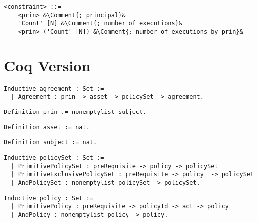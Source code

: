 \lstset{mathescape, language=AST, escapechar=\&}  
\begin{lstlisting}[frame=single, caption={constraint},label={lst:constraintast}]
<constraint> ::=  
	<prin> &\Comment{; principal}&
	'Count' [N] &\Comment{; number of executions}&
	<prin> ('Count' [N]) &\Comment{; number of executions by prin}&
\end{lstlisting}

\section{Coq Version}

\lstset{language=Coq}
\begin{lstlisting}[frame=single, caption={Coq version of agreement},label={lst:agreementcoq}]
Inductive agreement : Set :=
  | Agreement : prin -> asset -> policySet -> agreement.
\end{lstlisting}

\lstset{language=Coq}
\begin{lstlisting}[frame=single, caption={prin},label={lst:princoq}]
Definition prin := nonemptylist subject.
\end{lstlisting}

\lstset{language=Coq}
\begin{lstlisting}[frame=single, caption={asset},label={lst:assetcoq}]
Definition asset := nat.
\end{lstlisting}



\lstset{language=Coq}
\begin{lstlisting}[frame=single, caption={subject},label={lst:subjectcoq}]
Definition subject := nat.
\end{lstlisting}


\lstset{language=Coq}
\begin{lstlisting}[frame=single, caption={policySet},label={lst:policySetcoq}]
Inductive policySet : Set :=
  | PrimitivePolicySet : preRequisite -> policy -> policySet 
  | PrimitiveExclusivePolicySet : preRequisite -> policy  -> policySet 
  | AndPolicySet : nonemptylist policySet -> policySet.
\end{lstlisting}

\lstset{language=Coq}
\begin{lstlisting}[frame=single, caption={policy},label={lst:policycoq}]
Inductive policy : Set :=
  | PrimitivePolicy : preRequisite -> policyId -> act -> policy 
  | AndPolicy : nonemptylist policy -> policy.
\end{lstlisting}

